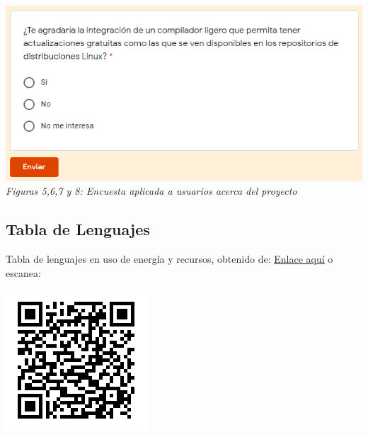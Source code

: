 \documentclass[10pt,executivepaper]{article}
\begin{document}
\begin{center}
\includegraphics[scale=0.5]{imgs/Encuesta4.png}
\\\textit{Figuras 5,6,7 y 8: Encuesta aplicada a usuarios acerca del proyecto }\\
\end{center}
\subsection{Tabla de Lenguajes}
Tabla de lenguajes en uso de energía y recursos, obtenido de: 
\href{https://greenlab.di.uminho.pt/wp-content/uploads/2017/10/sleFinal.pdf}{{\underline{Enlace aquí}}} o escanea:\\
\begin{center}\includegraphics[scale=0.75]{imgs/qrAnexo1.png}\end{center}
\printindex
\end{document}
